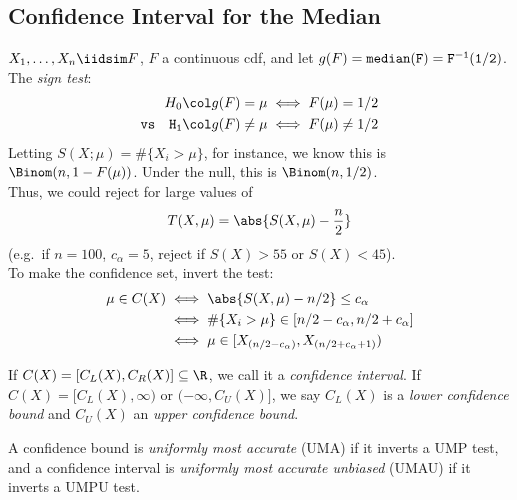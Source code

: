 \subsection*{Confidence Interval for the Median}
\sectionspace

$X_1, \ldots, X_n \iidsim F$, $F$ a continuous cdf, and let $g(F) = \tt{median}(F) = F^{-1}(1/2)$.\\

The \emph{sign test}:
\begin{align*}
    H_0 &\col g(F) = \mu \iff F(\mu) = 1/2\\
    \tt{vs} \quad H_1 &\col g(F) \neq \mu \iff F(\mu) \neq 1/2
\end{align*}
Letting $S(X; \mu) = \#\{X_i > \mu\}$, for instance, we know this is $\Binom(n, 1 - F(\mu))$. Under the null, this is $\Binom(n, 1/2)$.\\

Thus, we could reject for large values of
\[ T(X, \mu) = \abs{S(X, \mu) - \frac{n}{2}} \]
(e.g.\ if $n = 100$, $c_{\alpha} = 5$, reject if $S(X) > 55$ or $S(X) < 45$).\\

To make the confidence set, invert the test:
\begin{align*}
    \mu \in C(X) &\iff \abs{S(X, \mu) - n/2} \leq c_{\alpha}\\
    &\iff \#\{X_i > \mu\} \in [n/2 - c_{\alpha}, n/2 + c_{\alpha}]\\
    &\iff \mu \in [X_{(n/2 - c_{\alpha})}, X_{(n/2 + c_{\alpha} + 1)})
\end{align*}

\begin{definition}
    If $C(X) = [C_L(X), C_R(X)] \subseteq \R$, we call it a \emph{confidence interval}. If $C(X) = [C_L(X), \infty)$ or $(-\infty, C_U(X)]$, we say $C_L(X)$ is a \emph{lower confidence bound} and $C_U(X)$ an \emph{upper confidence bound}.
\end{definition}

\begin{definition}
    A confidence bound is \emph{uniformly most accurate} (UMA) if it inverts a UMP test, and a confidence interval is \emph{uniformly most accurate unbiased} (UMAU) if it inverts a UMPU test.
\end{definition}

